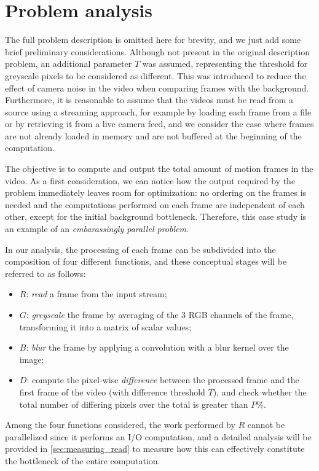 \documentclass{article}
\begin{document}
\section{Problem analysis}\label{sec:problemanalysis}

The full problem description is omitted here for brevity, and we just add some brief preliminary considerations. Although not present in the original description problem, an additional parameter $T$ was assumed, representing the threshold for greyscale pixels to be considered as different. This was introduced to reduce the effect of camera noise in the video when comparing frames with the background. Furthermore, it is reasonable to assume that the videos must be read from a source using a streaming approach, for example by loading each frame from a file or by retrieving it from a live camera feed, and we consider the case where frames are not already loaded in memory and are not buffered at the beginning of the computation.

The objective is to compute and output the total amount of motion frames in the video. As a first consideration, we can notice how the output required by the problem  immediately leaves room for optimization: no ordering on the frames is needed and the computations performed on each frame are independent of each other, except for the initial background bottleneck. Therefore, this case study is an example of an \emph{embarassingly parallel problem}. 

In our analysis, the processing of each frame can be subdivided into the composition of four different functions, and these conceptual stages will be referred to as follows:
\begin{itemize}
    \item $R$: \emph{read} a frame from the input stream;
    \item $G$: \emph{greyscale} the frame by averaging of the 3 RGB channels of the frame, transforming it into a matrix of scalar values;
    \item $B$: \emph{blur} the frame by applying a convolution with a blur kernel over the image;
    \item $D$: compute the pixel-wise \emph{difference} between the processed frame and the first frame of the video (with difference threshold $T$), and check whether the total number of differing pixels over the total is greater than $P\%$.
\end{itemize}

Among the four functions considered, the work performed by $R$ cannot be parallelized since it performs an I/O computation, and a detailed analysis will be provided in \autoref{sec:measuring_read} to measure how this can effectively constitute the bottleneck of the entire computation. %
\end{document}
